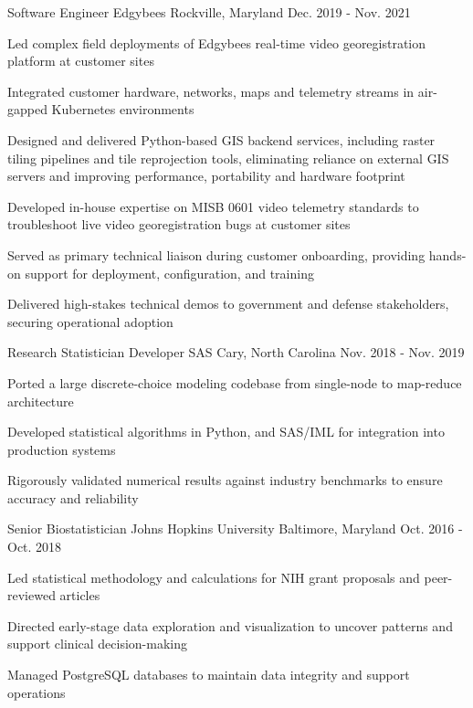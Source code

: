 \begin{cventries}
\cventry
{Software Engineer} %
{Edgybees} %
{Rockville, Maryland} %
{Dec. 2019 - Nov. 2021} %
{
  \begin{cvitems} %
  \item {Led complex field deployments of Edgybees real-time video georegistration platform at customer sites}
  \item {Integrated customer hardware, networks, maps and telemetry streams in air-gapped Kubernetes environments}
  \item {Designed and delivered Python-based GIS backend services, including raster tiling pipelines and tile reprojection tools, eliminating reliance on external GIS servers and improving performance, portability and hardware footprint}
  \item {Developed in-house expertise on MISB 0601 video telemetry standards to troubleshoot live video georegistration bugs at customer sites}
  \item {Served as primary technical liaison during customer onboarding, providing hands-on support for deployment, configuration, and training}
  \item {Delivered high-stakes technical demos to government and defense stakeholders, securing operational adoption}
\end{cvitems}
}


\cventry
{Research Statistician Developer} %
{SAS} %
{Cary, North Carolina} %
{Nov. 2018 - Nov. 2019} %
{
  \begin{cvitems}
    \item {Ported a large discrete-choice modeling codebase from single-node to map-reduce architecture}
    \item {Developed statistical algorithms in Python, and SAS/IML for integration into production systems}
    \item {Rigorously validated numerical results against industry benchmarks to ensure accuracy and reliability}  
  \end{cvitems}
}


\cventry
{Senior Biostatistician} %
{Johns Hopkins University} %
{Baltimore, Maryland} %
{Oct. 2016 - Oct. 2018} %
{
  \begin{cvitems}
    \item {Led statistical methodology and calculations for NIH grant proposals and peer-reviewed articles}
    \item {Directed early-stage data exploration and visualization to uncover patterns and support clinical decision-making}
    \item {Managed PostgreSQL databases to maintain data integrity and support operations}
  \end{cvitems}
}



\end{cventries}

